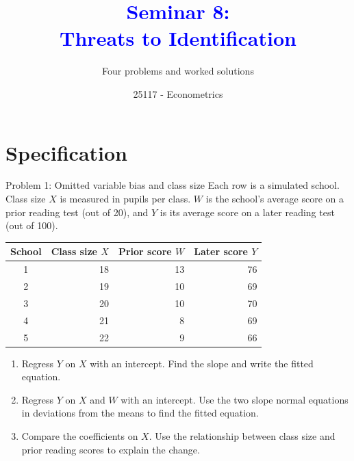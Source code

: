 \documentclass[notes,10pt, aspectratio=169]{beamer}
\title[]{\textcolor{blue}{Seminar 8:\\Threats to Identification}}
\subtitle{Four problems and worked solutions}
\author{25117 - Econometrics}
\institute[shortinst]{Universitat Pompeu Fabra}
\date{}
\begin{document}
\begin{frame}[plain]
\maketitle
\end{frame}

\section{Specification}
\begin{frame}{Problem 1: Omitted variable bias and class size}
\small
Each row is a simulated school. Class size $X$ is measured in pupils per class. $W$ is the school's average score on a prior reading test (out of 20), and $Y$ is its average score on a later reading test (out of 100).
\begin{center}
\renewcommand{\arraystretch}{1.12}
\begin{tabular}{c|rrr}
School & Class size $X$ & Prior score $W$ & Later score $Y$ \\
\hline
1 & 18 & 13 & 76 \\
2 & 19 & 10 & 69 \\
3 & 20 & 10 & 70 \\
4 & 21 & 8  & 69 \\
5 & 22 & 9  & 66 \\
\end{tabular}
\end{center}
\begin{enumerate}
\setlength{\itemsep}{6pt}
\item Regress $Y$ on $X$ with an intercept. Find the slope and write the fitted equation.
\item Regress $Y$ on $X$ and $W$ with an intercept. Use the two slope normal equations in deviations from the means to find the fitted equation.
\item Compare the coefficients on $X$. Use the relationship between class size and prior reading scores to explain the change.
\end{enumerate}
\end{frame}
\end{document}
